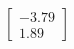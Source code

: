 \documentclass[preview]{standalone}
\begin{document}
\begin{align*}
\begin{bmatrix} -3.79 \\ 1.89 \end{bmatrix}
\end{align*}
\end{document}
